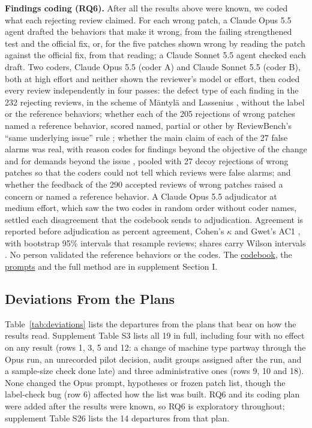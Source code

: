 \documentclass[sigconf,nonacm]{acmart}
\begin{document}
\textbf{Findings coding (RQ6).} After all the results above were known, we coded what each rejecting review claimed. For each wrong patch, a Claude Opus 5.5 agent drafted the behaviors that make it wrong, from the failing strengthened test and the official fix, or, for the five patches shown wrong by reading the patch against the official fix, from that reading; a Claude Sonnet 5.5 agent checked each draft. Two coders, Claude Opus 5.5 (coder A) and Claude Sonnet 5.5 (coder B), both at high effort and neither shown the reviewer's model or effort, then coded every review independently in four passes: the defect type of each finding in the 232 rejecting reviews, in the scheme of M\"antyl\"a and Lassenius \cite{mantyla2009defects}, without the label or the reference behaviors; whether each of the 205 rejections of wrong patches named a reference behavior, scored named, partial or other by ReviewBench's ``same underlying issue'' rule \cite{zhou2026reviewbench}; whether the main claim of each of the 27 false alarms was real, with reason codes for findings beyond the objective of the change \cite{lin2026coderabbit} and for demands beyond the issue \cite{jin2026overcorrection}, pooled with 27 decoy rejections of wrong patches so that the coders could not tell which reviews were false alarms; and whether the feedback of the 290 accepted reviews of wrong patches raised a concern or named a reference behavior. A Claude Opus 5.5 adjudicator at medium effort, which saw the two codes in random order without coder names, settled each disagreement that the codebook sends to adjudication. Agreement is reported before adjudication as percent agreement, Cohen's $\kappa$ \cite{cohen1960kappa} and Gwet's AC1 \cite{gwet2008ac1}, with bootstrap 95\% intervals that resample reviews; shares carry Wilson intervals \cite{wilson1927}. No person validated the reference behaviors or the codes. The \href{https://github.com/trustmybot/research-artifacts/blob/cr-effort-claude-5.5-v1.1/papers/cr-effort-claude-5.5/findings/codebook.md}{codebook}, the \href{https://github.com/trustmybot/research-artifacts/tree/cr-effort-claude-5.5-v1.1/papers/cr-effort-claude-5.5/findings/prompts}{prompts} and the full method are in supplement Section I.

\subsection{Deviations From the Plans}\label{sec:deviations}

Table~\ref{tab:deviations} lists the departures from the plans that bear on how the results read. Supplement Table S3 lists all 19 in full, including four with no effect on any result (rows 1, 3, 5 and 12: a change of machine type partway through the Opus run, an unrecorded pilot decision, audit groups assigned after the run, and a sample-size check done late) and three administrative ones (rows 9, 10 and 18). None changed the Opus prompt, hypotheses or frozen patch list, though the label-check bug (row 6) affected how the list was built. RQ6 and its coding plan were added after the results were known, so RQ6 is exploratory throughout; supplement Table S26 lists the 14 departures from that plan.
\end{document}
